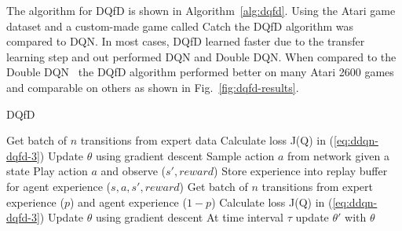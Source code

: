 \documentclass[12pt,american]{report}
\begin{document}
The algorithm for DQfD is shown in Algorithm~\ref{alg:dqfd}. Using the Atari game dataset and a custom-made game called Catch the DQfD algorithm was compared to DQN.  In most cases, DQfD learned faster due to the transfer learning step and out performed DQN and Double DQN. When compared to the Double DQN~\cite{van2016deep} the DQfD algorithm performed better on many Atari 2600 games and comparable on others as shown in Fig.~\ref{fig:dqfd-results}. 
\begin{algorithm}
\caption{DQfD~\cite{hester2017learning}}
\label{alg:dqfd}
\begin{algorithmic} 
\State Get batch of $n$ transitions from expert data
\State Calculate loss J(Q) in (\ref{eq:ddqn-dqfd-3})
\State Update $\theta$ using gradient descent
\EndFor
{}
\State Sample action $a$ from network given a state
\State Play action $a$ and observe ($s',reward$)
\State Store experience into replay buffer for agent experience ($s,a,s',reward$)
\State Get batch of $n$ transitions from expert experience ($p$) and agent experience ($1-p$)
\State Calculate loss J(Q) in (\ref{eq:ddqn-dqfd-3})
\State Update $\theta$ using gradient descent
\State At time interval $\tau$ update $\theta'$ with $\theta$
\EndFor
\end{algorithmic}
\end{algorithm}
\end{document}
